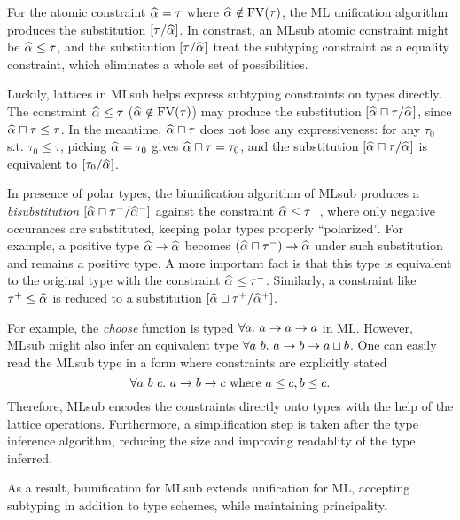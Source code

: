 For the atomic constraint $\al = \tau$ where $\al \notin \text{FV}(\tau)$,
the ML unification algorithm produces the substitution $[\tau/\al]$.
In constrast, an MLsub atomic constraint might be $\al \le \tau$,
and the substitution $[\tau/\al]$ treat the subtyping constraint as a equality constraint,
which eliminates a whole set of possibilities.

Luckily, lattices in MLsub helps express subtyping constraints on types directly.
The constraint $\al \le \tau$ ($\al \notin \text{FV}(\tau)$) may produce the substitution
$[\al \sqcap \tau/\al]$, since $\al \sqcap \tau \le \tau$.
In the meantime, $\al \sqcap \tau$ does not lose any expressiveness:
for any $\tau_0$ s.t. $\tau_0 \le \tau$,
picking $\al = \tau_0$ gives $\al \sqcap \tau = \tau_0$,
and the substitution $[\al \sqcap \tau/\al]$ is equivalent to $[\tau_0/\al]$.

In presence of polar types, the biunification algorithm of MLsub
produces a \emph{bisubstitution} $[\al \sqcap \tau^-/\al^-]$
against the constraint $\al \le \tau^-$,
where only negative occurances are substituted,
keeping polar types properly ``polarized''.
For example, a positive type $\al \to \al$ becomes $(\al \sqcap \tau^-) \to \al$
under such substitution and remains a positive type.
A more important fact is that this type is equivalent to
the original type with the constraint $\al \le \tau^-$.
Similarly, a constraint like $\tau^+ \le \al$ is reduced to
a substitution $[\al \sqcup \tau^+/\al^+]$.

For example, the \emph{choose} function is typed $\all a \to a \to a$ in ML.
However, MLsub might also infer an equivalent type
$\all[a~b] a \to b \to a \sqcup b$.
One can easily read the MLsub type in a form
where constraints are explicitly stated
\[\all[a~b~c] a \to b \to c \text{ where } a \le c, b \le c.\]
Therefore, MLsub encodes the constraints directly onto types with the help of
the lattice operations.
Furthermore, a simplification step is taken after the type inference algorithm,
reducing the size and improving readablity of the type inferred.

As a result, biunification for MLsub extends unification for ML,
accepting subtyping in addition to type schemes,
while maintaining principality.

